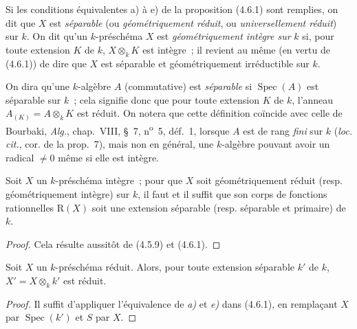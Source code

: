 \begin{definition}[4.6.2]
\label{IV.2.4.6.2-fr}
Si les conditions équivalentes \textup{a)} à \textup{e)} de la proposition \textup{(4.6.1)} sont
remplies, on dit que $X$ est \emph{séparable} (ou \emph{géométriquement réduit},
ou \emph{universellement réduit}) \textup{sur} $k$. On dit qu'un $k$-préschéma $X$ est
\emph{géométriquement intègre sur} $k$ si, pour toute extension $K$ de $k$,
$X\otimes_k K$ est intègre~; il revient au même (en vertu de \textup{(4.6.1)}) de dire
que $X$ est séparable et géométriquement irréductible sur $k$.
\end{definition}

On dira qu'une $k$-algèbre $A$ (commutative) est \emph{séparable} si
$\operatorname{Spec}(A)$ est séparable sur $k$~; cela signifie donc que pour
toute extension $K$ de $k$, l'anneau $A_{(K)}=A\otimes_k K$ est réduit. On
notera que cette définition coïncide avec celle de Bourbaki, \emph{Alg.},
chap.~VIII,
\S~7, n\textsuperscript{o}~5, déf.~1, lorsque $A$ est de rang \emph{fini} sur
$k$ (\emph{loc. cit.}, cor. de la prop.~7), mais non en général, une $k$-algèbre
pouvant avoir un radical $\neq0$ même si elle est intègre.

\begin{corollary}[4.6.3]
\label{IV.2.4.6.3-fr}
Soit $X$ un $k$-préschéma intègre~; pour que $X$ soit géométriquement réduit
\textup{(resp.} géométriquement intègre\textup{)} sur $k$, il faut et il suffit que son corps de
fonctions rationnelles $\mathrm R(X)$ soit une extension séparable \textup{(resp.}
séparable et primaire\textup{)} de $k$.
\end{corollary}

\begin{proof}
Cela résulte aussitôt de (4.5.9) et (4.6.1).
\end{proof}

\begin{corollary}[4.6.4]
\label{IV.2.4.6.4-fr}
Soit $X$ un $k$-préschéma réduit. Alors, pour toute extension séparable $k'$ de
$k$, $X'=X\otimes_k k'$ est réduit.
\end{corollary}

\begin{proof}
Il suffit d'appliquer l'équivalence de \emph{a)} et \emph{e)} dans (4.6.1), en remplaçant
$X$ par $\operatorname{Spec}(k')$ et $S$ par $X$.
\end{proof}

